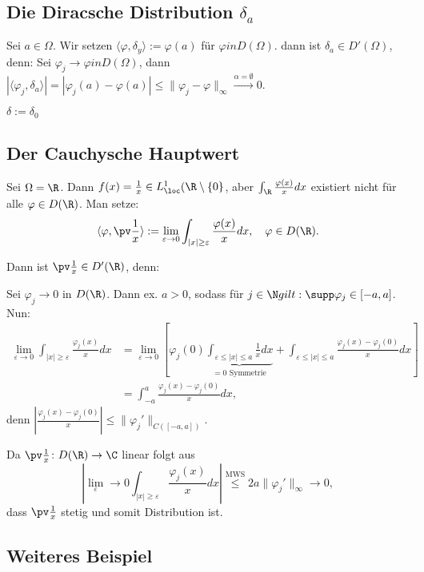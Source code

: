 \subsection{Die Diracsche Distribution $\delta_a$}

Sei $a \in \Omega$.
Wir setzen $\langle \varphi, \delta_y\rangle := \varphi(a)$ für $\varphi in D(\Omega)$.
dann ist $\delta_a \in D'(\Omega)$, denn: Sei $\varphi_j \to \varphi in D(\Omega)$, dann $|\langle \varphi_j, \delta_a \rangle| = |\varphi_j(a) - \varphi(a)| \leq \|\varphi_j - \varphi\|_\infty \overset{\alpha = \emptyset}{\to} 0$.

\begin{ntion}
  $\delta := \delta_0$
\end{ntion}

\subsection{Der Cauchysche Hauptwert}
Sei $\Omega = \R$.
Dann $f(x) = \frac{1}{x} \in L^1_{\loc}(\R\setminus\{0\}$, aber $\int_\R \frac{\varphi(x)}{x} dx$ existiert nicht für alle $\varphi \in D(\R)$.
Man setze:
$$
\langle \varphi,\pv \frac{1}{x} \rangle := \lim_{\varepsilon \to 0} \int_{|x| \geq \varepsilon} \frac{\varphi(x)}{x} dx, \quad \varphi \in D(\R).
$$

Dann ist $\pv \frac{1}{x} \in D'(\R)$, denn:

Sei $\varphi_j \to 0$ in $D(\R)$.
Dann ex. $a > 0$, sodass für $j \in \N gilt: \supp \varphi_j \in [-a,a]$.
Nun:
\begin{align*}
\lim_{\varepsilon \to 0} \int_{|x| \geq \varepsilon} \frac{\varphi_j(x)}{x} dx 
&= \lim_{\varepsilon \to 0} \left[ \varphi_j(0) \underbrace{\int_{\varepsilon \leq |x| \leq a} \frac{1}{x} dx}_{= 0 \text{ Symmetrie}}
+ \int_{\varepsilon \leq |x| \leq a} \frac{\varphi_j(x) - \varphi_j(0)}{x} dx \right] \\
&= \int_{-a}^a \frac{\varphi_j(x) - \varphi_j(0)}{x} dx,
\end{align*}
denn $|\frac{\varphi_j(x) - \varphi_j(0)}{x}|\leq \|\varphi_j'\|_{C([-a,a])}$.

Da $\pv \frac{1}{x} \colon D(\R) \to \C$ linear folgt aus
$$
| \lim_\varepsilon \to 0 \int_{|x| \geq \varepsilon} \frac{\varphi_j(x)}{x} dx | \overset{\text{MWS}}{\leq} 2a \| \varphi_j'\|_\infty \to 0,
$$
dass $\pv \frac{1}{x}$ stetig und somit Distribution ist.

\subsection{Weiteres Beispiel}

